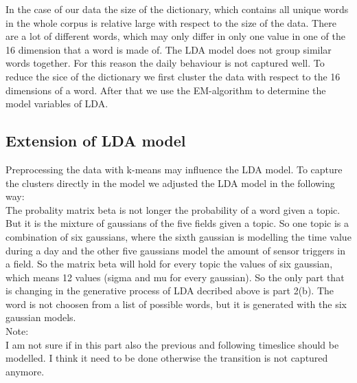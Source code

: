 \documentclass[11pt,a4paper]{article}
\begin{document}
In the case of our data the size of the dictionary, which contains all unique words in the whole corpus is relative large with respect to the size of the data. There are a lot of different words, which may only differ in only one value in one of the 16 dimension that a word is made of. The LDA model does not group similar words together. For this reason the daily behaviour is not captured well.
To reduce the sice of the dictionary we first cluster the data with respect to the 16 dimensions of a word. After that we use the EM-algorithm to determine the model variables of LDA.


\subsection{Extension of LDA model}
Preprocessing the data with k-means may influence the LDA model. To capture the clusters directly in the model we adjusted the LDA model in the following way:\\
The probality matrix beta is not longer the probability of a word given a topic. But it is the mixture of gaussians of the five fields given a topic. So one topic is a combination of six gaussians, where the sixth gaussian is modelling the time value during a day and the other five gaussians model the amount of sensor triggers in a field. So the matrix beta will hold for every topic the values of six gaussian, which means 12 values (sigma and mu for every gaussian).
 So the only part that is changing in the generative process of LDA decribed above is part 2(b). The word is not choosen from a list of possible words, but it is generated with the six gaussian models.\\
 
 Note:\\
 I am not sure if in this part also the previous and following timeslice should be modelled. I think it need to be done otherwise the transition is not captured anymore.
\end{document}
